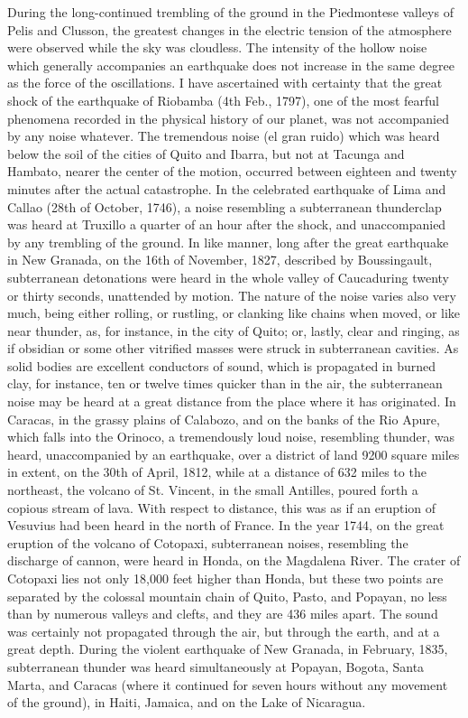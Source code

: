 During the long-continued trembling of the ground in the Piedmontese valleys of Pelis and Clusson, the greatest changes in the electric tension of the atmosphere were observed while the sky was cloudless. The intensity of the hollow noise which generally accompanies an earthquake does not increase in the same degree as the force of the oscillations. I have ascertained with certainty that the great shock of the earthquake of Riobamba (4th Feb., 1797), one of the most fearful phenomena recorded in the physical history of our planet, was not accompanied by any noise whatever. The tremendous noise (el gran ruido) which was heard below the soil of the cities of Quito and Ibarra, but not at Tacunga and Hambato, nearer the center of the motion, occurred between eighteen and twenty minutes after the actual catastrophe. In the celebrated earthquake of Lima and Callao (28th of October, 1746), a noise resembling a subterranean thunderclap was heard at Truxillo a quarter of an hour after the shock, and unaccompanied by any trembling of the ground. In like manner, long after the great earthquake in New Granada, on the 16th of November, 1827, described by Boussingault, subterranean detonations were heard in the whole valley of Caucaduring twenty or thirty seconds, unattended by motion. The nature of the noise varies also very much, being either rolling, or rustling, or clanking like chains when moved, or like near thunder, as, for instance, in the city of Quito; or, lastly, clear and ringing, as if obsidian or some other vitrified masses were struck in subterranean cavities. As solid bodies are excellent conductors of sound, which is propagated in burned clay, for instance, ten or twelve times quicker than in the air, the subterranean noise may be heard at a great distance from the place where it has originated. In Caracas, in the grassy plains of Calabozo, and on the banks of the Rio Apure, which falls into the Orinoco, a tremendously loud noise, resembling thunder, was heard, unaccompanied by an earthquake, over a district of land 9200 square miles in extent, on the 30th of April, 1812, while at a distance of 632 miles to the northeast, the volcano of St. Vincent, in the small Antilles, poured forth a copious stream of lava. With respect to distance, this was as if an eruption of Vesuvius had been heard in the north of France. In the year 1744, on the great eruption of the volcano of Cotopaxi, subterranean noises, resembling the discharge of cannon, were heard in Honda, on the Magdalena River. The crater of Cotopaxi lies not only 18,000 feet higher than Honda, but these two points are separated by the colossal mountain chain of Quito, Pasto, and Popayan, no less than by numerous valleys and clefts, and they are 436 miles apart. The sound was certainly not propagated through the air, but through the earth, and at a great depth. During the violent earthquake of New Granada, in February, 1835, subterranean thunder was heard simultaneously at Popayan, Bogota, Santa Marta, and Caracas (where it continued for seven hours without any movement of the ground), in Haiti, Jamaica, and on the Lake of Nicaragua.

